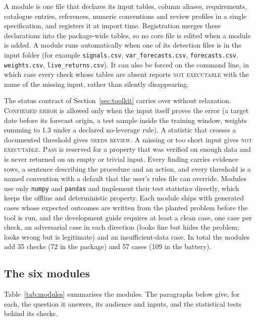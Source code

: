 \documentclass[11pt]{article}
\begin{document}
A module is one file that declares its input tables, column aliases, requirements, catalogue entries, references, numeric conventions and review profiles in a single specification, and registers it at import time. Registration merges these declarations into the package-wide tables, so no core file is edited when a module is added. A module runs automatically when one of its detection files is in the input folder (for example \texttt{signals.csv}, \texttt{var\_forecasts.csv}, \texttt{forecasts.csv}, \texttt{weights.csv}, \texttt{live\_returns.csv}). It can also be forced on the command line, in which case every check whose tables are absent reports \textsc{not executable} with the name of the missing input, rather than silently disappearing.

The status contract of Section~\ref{sec:toolkit} carries over without relaxation. \textsc{Confirmed error} is allowed only when the input itself proves the error (a target date before its forecast origin, a test sample inside the training window, weights summing to 1.3 under a declared no-leverage rule). A statistic that crosses a documented threshold gives \textsc{needs review}. A missing or too short input gives \textsc{not executable}. \textsc{Pass} is reserved for a property that was verified on enough data and is never returned on an empty or trivial input. Every finding carries evidence rows, a sentence describing the procedure and an action, and every threshold is a named convention with a default that the user's rules file can override. Modules use only \texttt{numpy} and \texttt{pandas} and implement their test statistics directly, which keeps the offline and deterministic property. Each module ships with generated cases whose expected outcomes are written from the planted problem before the tool is run, and the development guide requires at least a clean case, one case per check, an adversarial case in each direction (looks fine but hides the problem; looks wrong but is legitimate) and an insufficient-data case. In total the modules add 35 checks (72 in the package) and 57 cases (109 in the battery).

\subsection{The six modules}

Table~\ref{tab:modules} summarises the modules. The paragraphs below give, for each, the question it answers, its audience and inputs, and the statistical tests behind its checks.
\end{document}
